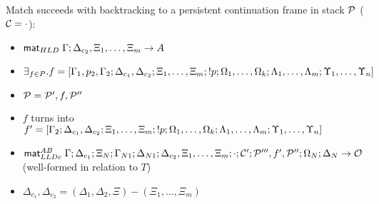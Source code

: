    \item Match succeeds with backtracking to a persistent continuation frame
   in stack $\mathcal{P}$ ($\mathcal{C} = \cdot$):
   \begin{itemize}[leftmargin=\secondm]
      \item $\mathsf{mat}_{HLD} \; \Gamma; \Delta_{c_2}, \Xi_1, \dotsc, \Xi_m \rightarrow A$
      \item $\exists_{f \in P}. f = [\Gamma_1, p_2, \Gamma_2; \Delta_{c_1}, \Delta_{c_2};
   \Xi_1, \dotsc, \Xi_m; {!} p; \Omega_1, \dotsc, \Omega_k; \Lambda_1,
   \dotsc, \Lambda_m; \Upsilon_1, \dotsc, \Upsilon_n]$
      \item $\mathcal{P} = \mathcal{P'}, f, \mathcal{P''}$
      \item $f$ turns into $f' = [\Gamma_2; \Delta_{c_1},
         \Delta_{c_2}; \Xi_1, \dotsc, \Xi_m; {!} p; \Omega_1, \dotsc,
         \Omega_k; \Lambda_1, \dotsc, \Lambda_m; \Upsilon_1, \dotsc, \Upsilon_n]$
      \item $\mathsf{mat}_{LLDc}^{AB} \; \Gamma; \Delta_{c_1}; \Xi_N; \Gamma_{N1}; \Delta_{N1};
      \Delta_{c_2}, \Xi_1, \dotsc, \Xi_m; \cdot; \mathcal{C'}; \mathcal{P'''}, f',
      \mathcal{P''};
      \Omega_N; \Delta_N \rightarrow \mathcal{O}$
      (well-formed in relation to $T$)
      \item $\Delta_{c_1}, \Delta_{c_2} = (\Delta_1, \Delta_2, \Xi) - (\Xi_1, \dotsc,
            \Xi_m)$
   \end{itemize}
